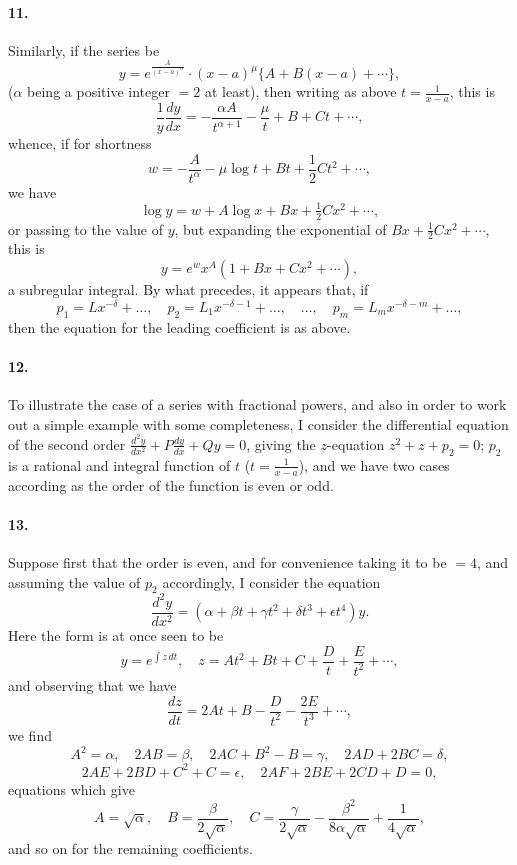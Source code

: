 \documentclass[11pt,a4paper]{article}
\theoremstyle{definition}
\begin{document}
\paragraph{11.} Similarly, if the series be
\[
y = e^{\frac{A}{(x-a)^{\alpha}}} \cdot (x-a)^{\mu}\{A + B(x-a) + \cdots\},
\]
($\alpha$ being a positive integer $= 2$ at least), then writing as above $t = \frac{1}{x-a}$, this is
\[
\frac{1}{y}\frac{dy}{dx} = -\frac{\alpha A}{t^{\alpha+1}} - \frac{\mu}{t} + B + Ct + \cdots,
\]
whence, if for shortness
\[
w = -\frac{A}{t^{\alpha}} - \mu\log t + Bt + \frac{1}{2}Ct^{2} + \cdots,
\]
we have
\[
\log y = w + A\log x + Bx + \tfrac{1}{2}Cx^{2} + \cdots,
\]
or passing to the value of $y$, but expanding the exponential of $Bx + \tfrac{1}{2}Cx^{2} + \cdots$, this is
\[
y = e^{w} x^{A} (1 + Bx + Cx^{2} + \cdots),
\]
a subregular integral. By what precedes, it appears that, if
\[
p_{1} = Lx^{-\delta} + \ldots, \quad p_{2} = L_{1}x^{-\delta-1} + \ldots, \quad \ldots, \quad p_{m} = L_{m}x^{-\delta-m} + \ldots,
\]
then the equation for the leading coefficient is as above.

\paragraph{12.} To illustrate the case of a series with fractional powers, and also in order to work out a simple example with some completeness, I consider the differential equation of the second order $\frac{d^{2}y}{dx^{2}} + P\frac{dy}{dx} + Qy = 0$, giving the $z$-equation $z^{2} + z + p_{2} = 0$; $p_{2}$ is a rational and integral function of $t$ ($t = \frac{1}{x-a}$), and we have two cases according as the order of the function is even or odd.

\paragraph{13.} Suppose first that the order is even, and for convenience taking it to be $= 4$, and assuming the value of $p_{2}$ accordingly, I consider the equation
\[
\frac{d^{2}y}{dx^{2}} = (\alpha + \beta t + \gamma t^{2} + \delta t^{3} + \epsilon t^{4})y.
\]
Here the form is at once seen to be
\[
y = e^{\int z\,dt}, \quad z = At^{2} + Bt + C + \frac{D}{t} + \frac{E}{t^{2}} + \cdots,
\]
and observing that we have
\[
\frac{dz}{dt} = 2At + B - \frac{D}{t^{2}} - \frac{2E}{t^{3}} + \cdots,
\]
we find
\[
A^{2} = \alpha, \quad 2AB = \beta, \quad 2AC + B^{2} - B = \gamma, \quad 2AD + 2BC = \delta,
\]
\[
2AE + 2BD + C^{2} + C = \epsilon, \quad 2AF + 2BE + 2CD + D = 0,
\]
equations which give
\[
A = \sqrt{\alpha}, \quad B = \frac{\beta}{2\sqrt{\alpha}}, \quad C = \frac{\gamma}{2\sqrt{\alpha}} - \frac{\beta^{2}}{8\alpha\sqrt{\alpha}} + \frac{1}{4\sqrt{\alpha}},
\]
and so on for the remaining coefficients.
\end{document}
